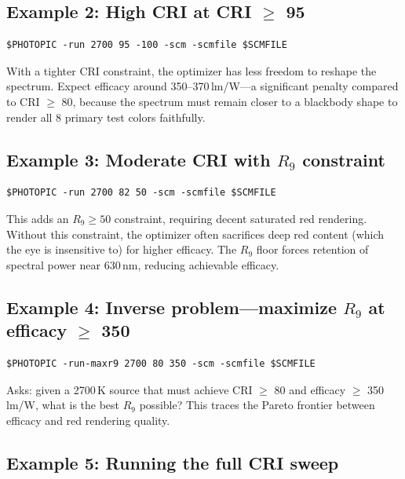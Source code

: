 \documentclass[11pt]{article}
\begin{document}
\subsection{Example 2: High CRI at CRI $\geq$ 95}

\begin{lstlisting}[style=shell]
$PHOTOPIC -run 2700 95 -100 -scm -scmfile $SCMFILE
\end{lstlisting}

With a tighter CRI constraint, the optimizer has less freedom to reshape
the spectrum.  Expect efficacy around 350--370\,lm/W---a significant
penalty compared to CRI $\geq$ 80, because the spectrum must remain closer
to a blackbody shape to render all 8 primary test colors faithfully.

\subsection{Example 3: Moderate CRI with \texorpdfstring{$R_9$}{R9} constraint}

\begin{lstlisting}[style=shell]
$PHOTOPIC -run 2700 82 50 -scm -scmfile $SCMFILE
\end{lstlisting}

This adds an $R_9 \geq 50$ constraint, requiring decent saturated red
rendering.  Without this constraint, the optimizer often sacrifices deep
red content (which the eye is insensitive to) for higher efficacy.  The
$R_9$ floor forces retention of spectral power near 630\,nm, reducing
achievable efficacy.

\subsection{Example 4: Inverse problem---maximize \texorpdfstring{$R_9$}{R9} at efficacy \texorpdfstring{$\geq$}{>=} 350}

\begin{lstlisting}[style=shell]
$PHOTOPIC -run-maxr9 2700 80 350 -scm -scmfile $SCMFILE
\end{lstlisting}

Asks: given a 2700\,K source that must achieve CRI $\geq$ 80 and
efficacy $\geq$ 350\,lm/W, what is the best $R_9$ possible?  This
traces the Pareto frontier between efficacy and red rendering quality.

\subsection{Example 5: Running the full CRI sweep}
\end{document}
